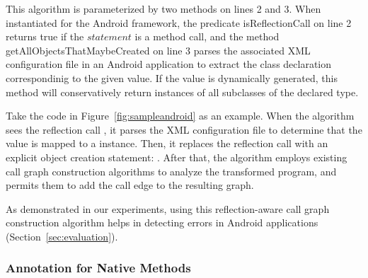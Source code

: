 This algorithm is parameterized by two methods on
lines 2 and 3. When instantiated for the Android framework,
the predicate isReflectionCall on line 2 returns true
if the $statement$ is a  method call, and the method
getAllObjectsThatMaybeCreated on line 3 parses the associated XML configuration
file in an Android application to extract the class declaration
 correspondinig to the given  value. If the 
value is dynamically generated, this method will conservatively
return instances of all subclasses of the declared type.

Take the code in Figure~\ref{fig:sampleandroid} as an example.
When the algorithm sees the reflection call
, it
parses the XML configuration file to determine that the 
value is mapped to a  instance. Then, it
replaces the reflection call
with an explicit object creation statement: .
After that, the algorithm employs existing call graph construction
algorithms to analyze the transformed program, and permits them
to add the call edge  to the resulting graph.

As demonstrated in our experiments, using this reflection-aware call
graph construction algorithm helps in detecting errors
in Android applications (Section~\ref{sec:evaluation}).



\subsubsection{Annotation for Native Methods}
\label{sec:annotation}

